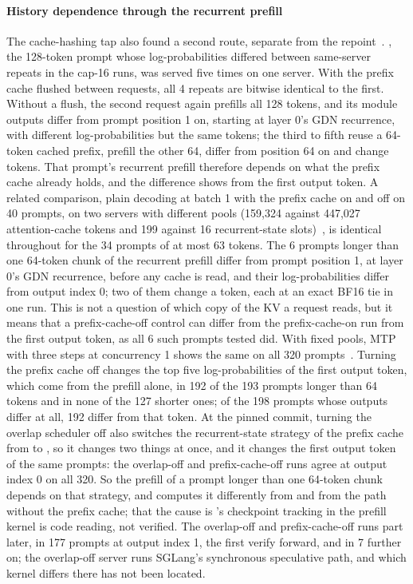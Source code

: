 \paragraph{History dependence through the recurrent prefill} The cache-hashing tap also found a second route, separate from the repoint~. , the 128-token prompt whose log-probabilities differed between same-server repeats in the cap-16 runs, was served five times on one server. With the prefix cache flushed between requests, all 4 repeats are bitwise identical to the first. Without a flush, the second request again prefills all 128 tokens, and its module outputs differ from prompt position 1 on, starting at layer 0's GDN recurrence, with different log-probabilities but the same tokens; the third to fifth reuse a 64-token cached prefix, prefill the other 64, differ from position 64 on and change tokens. That prompt's recurrent prefill therefore depends on what the prefix cache already holds, and the difference shows from the first output token. A related comparison, plain decoding at batch 1 with the prefix cache on and off on 40 prompts, on two servers with different pools (159,324 against 447,027 attention-cache tokens and 199 against 16 recurrent-state slots)~, is identical throughout for the 34 prompts of at most 63 tokens. The 6 prompts longer than one 64-token chunk of the recurrent prefill differ from prompt position 1, at layer 0's GDN recurrence, before any cache is read, and their log-probabilities differ from output index 0; two of them change a token, each at an exact BF16 tie in one run. This is not a question of which copy of the KV a request reads, but it means that a prefix-cache-off control can differ from the prefix-cache-on run from the first output token, as all 6 such prompts tested did. With fixed pools, MTP with three steps at concurrency 1 shows the same on all 320 prompts~. Turning the prefix cache off changes the top five log-probabilities of the first output token, which come from the prefill alone, in 192 of the 193 prompts longer than 64 tokens and in none of the 127 shorter ones; of the 198 prompts whose outputs differ at all, 192 differ from that token. At the pinned commit, turning the overlap scheduler off also switches the recurrent-state strategy of the prefix cache from  to , so it changes two things at once, and it changes the first output token of the same prompts: the overlap-off and prefix-cache-off runs agree at output index 0 on all 320. So the prefill of a prompt longer than one 64-token chunk depends on that strategy, and  computes it differently from  and from the path without the prefix cache; that the cause is 's checkpoint tracking in the prefill kernel is code reading, not verified. The overlap-off and prefix-cache-off runs part later, in 177 prompts at output index 1, the first verify forward, and in 7 further on; the overlap-off server runs SGLang's synchronous speculative path, and which kernel differs there has not been located.

